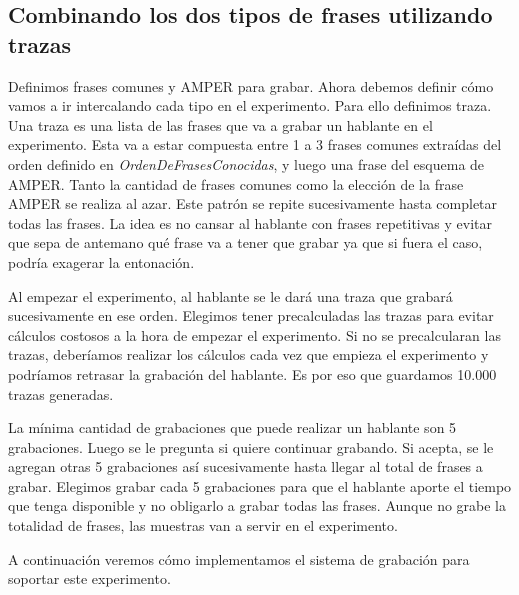 \subsection{Combinando los dos tipos de frases utilizando trazas}

Definimos frases comunes y AMPER para grabar. Ahora debemos definir cómo vamos a ir intercalando cada tipo en el experimento. Para ello definimos traza. Una traza es una lista de las frases que va a grabar un hablante en el experimento. Esta va a estar compuesta entre 1 a 3 frases comunes extraídas del orden definido en \textit{OrdenDeFrasesConocidas}, y luego una frase del esquema de AMPER. Tanto la cantidad de frases comunes como la elección de la frase AMPER se realiza al azar. Este patrón se repite sucesivamente hasta completar todas las frases. La idea es no cansar al hablante con frases repetitivas y evitar que sepa de antemano qué frase va a tener que grabar ya que si fuera el caso, podría exagerar la entonación.

Al empezar el experimento, al hablante se le dará una traza que grabará sucesivamente en ese orden. Elegimos tener precalculadas las trazas para evitar cálculos costosos a la hora de empezar el experimento. Si no se precalcularan las trazas, deberíamos realizar los cálculos cada vez que empieza el experimento y podríamos retrasar la grabación del hablante. Es por eso que guardamos 10.000 trazas generadas. 

La mínima cantidad de grabaciones que puede realizar un hablante son 5 grabaciones. Luego se le pregunta si quiere continuar grabando. Si acepta, se le agregan otras 5 grabaciones así sucesivamente hasta llegar al total de frases a grabar. Elegimos grabar cada 5 grabaciones para que el hablante aporte el tiempo que tenga disponible y no obligarlo a grabar todas las frases. Aunque no grabe la totalidad de frases, las muestras van a servir en el experimento.

A continuación veremos cómo implementamos el sistema de grabación para soportar este experimento.
